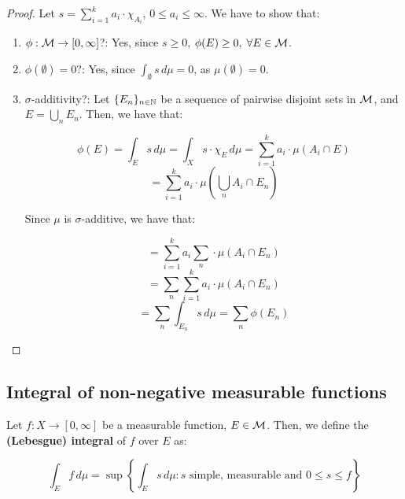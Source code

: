 \begin{proof}
    Let $s = \sum_{i=1}^k a_i \cdot \chi_{A_i}$, $0 \leq a_i \leq \infty$. We have to show that:

    \begin{enumerate}
        \item $\phi: \mathcal{M} \to [0, \infty]$?: Yes, since $s \geq 0$, $\phi(E) \geq 0, \; \forall E \in \mathcal{M}$.
        
        \item $\phi(\emptyset) = 0$?: Yes, since $\int_{\emptyset} s \, d\mu = 0$, as $\mu(\emptyset) = 0$.
        
        \item $\sigma$-additivity?: Let $\{E_n\}_{n \in \mathbb{N}}$ be a sequence of pairwise disjoint sets in $\mathcal{M}$, 
        and $E = \bigcup_{n} E_n$. Then, we have that:

        $$\phi(E) = \int_{E} s \, d\mu = \int_{X} s \cdot \chi_E \, d\mu = \sum_{i=1}^k a_i \cdot \mu(A_i \cap E)$$
        $$= \sum_{i=1}^k a_i \cdot \mu\left(\bigcup_{n} A_i \cap E_n\right)$$

        Since $\mu$ is $\sigma$-additive, we have that:

        $$= \sum_{i=1}^k a_i \sum_{n}  \cdot \mu(A_i \cap E_n)$$
        $$= \sum_{n} \sum_{i=1}^k a_i \cdot \mu(A_i \cap E_n)$$
        $$= \sum_{n} \int_{E_n} s \, d\mu = \sum_{n} \phi(E_n)$$
    \end{enumerate}

\end{proof}

\subsection{Integral of non-negative measurable functions}

\begin{fdefinition}
    Let $f: X \to [0, \infty]$ be a measurable function, $E \in \mathcal{M}$. Then, we define the 
    \textbf{(Lebesgue) integral} of $f$ over $E$ as:

    $$\int_{E} f \, d\mu = \sup\left\{\int_{E} s \, d\mu: s \text{ simple, measurable and } 0 \leq s \leq f\right\}$$
\end{fdefinition}

